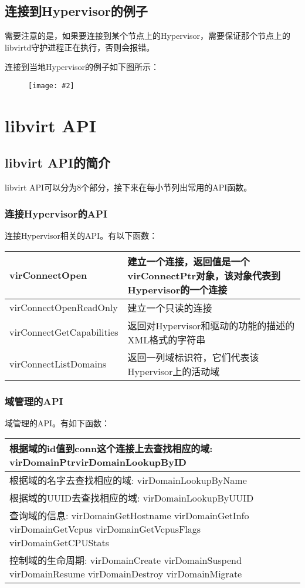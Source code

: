 \documentclass[a4paper,left=2.5cm,right=2.5cm,11pt]{article}
\newcommand{\sizedfic}[2]{\begin{figure}[H]
		\center
		\texttt{[image: \#2]}
	\end{figure}}
\begin{document}
\subsection{连接到Hypervisor的例子}
	需要注意的是，如果要连接到某个节点上的Hypervisor，需要保证那个节点上的libvirtd守护进程正在执行，否则会报错。\par
	连接到当地Hypervisor的例子如下图所示：
	\sizedfic{0.7}{6.png}


\clearpage

\section{libvirt API}
\subsection{libvirt API的简介}
	libvirt API可以分为8个部分，接下来在每小节列出常用的API函数。
\subsubsection{连接Hypervisor的API}
		连接Hypervisor相关的API。有以下函数：
		\begin{longtable}{p{3.8cm}p{10.5cm}}
		\hline
		virConnectOpen & 建立一个连接，返回值是一个virConnectPtr对象，该对象代表到Hypervisor的一个连接 \\
		\hline
		virConnectOpenReadOnly & 建立一个只读的连接 \\
		\hline
		virConnectGetCapabilities & 返回对Hypervisor和驱动的功能的描述的XML格式的字符串 \\
		\hline
		virConnectListDomains & 返回一列域标识符，它们代表该Hypervisor上的活动域 \\
		\hline 
		\end{longtable}


\subsubsection{域管理的API}

		域管理的API。有如下函数：
		\begin{longtable}{p{15cm}}
		\hline
		根据域的id值到conn这个连接上去查找相应的域: virDomainPtrvirDomainLookupByID \\
		\hline
		根据域的名字去查找相应的域: virDomainLookupByName \\
		\hline
		根据域的UUID去查找相应的域: virDomainLookupByUUID  \\
		\hline
		查询域的信息: virDomainGetHostname virDomainGetInfo virDomainGetVcpus virDomainGetVcpusFlags virDomainGetCPUStats \\
		\hline
		控制域的生命周期: virDomainCreate virDomainSuspend virDomainResume virDomainDestroy virDomainMigrate \\
		\hline 
		\end{longtable}
\end{document}
